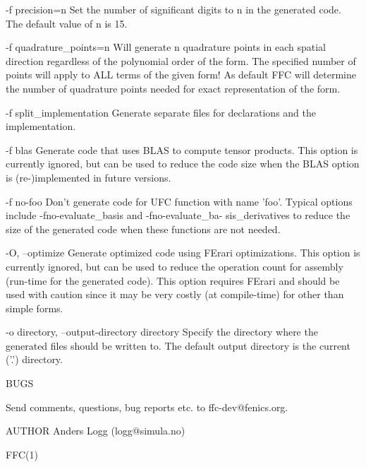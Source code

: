        -f precision=n
              Set the number of significant digits to n in the generated code.
              The default value of n is 15.

       -f quadrature_points=n
              Will generate n quadrature points in each spatial direction
              regardless of the polynomial order of the form. The specified
              number  of  points  will apply to ALL terms of the given form!
              As default FFC will determine the number of quadrature points
              needed for exact representation of the form.

       -f split_implementation
              Generate separate files for declarations and the implementation.

       -f blas
              Generate  code that uses BLAS to compute tensor products.  This
              option is currently ignored, but can be used to reduce the code
              size when the BLAS option is (re-)implemented in future versions.

       -f no-foo
              Don't generate code for UFC function with name 'foo'. Typical
              options   include   -fno-evaluate_basis   and  -fno-evaluate_ba-
              sis_derivatives to reduce the size  of  the generated code when
              these functions are not needed.

       -O, --optimize
              Generate optimized code using FErari optimizations. This  option
              is  currently  ignored,  but can be used to reduce the operation
              count for assembly  (run-time  for  the  generated  code).  This
              option  requires FErari and should be used with caution since it
              may be very costly  (at  compile-time)  for  other  than  simple
              forms.

       -o directory, --output-directory directory
              Specify the directory where the generated files should be written
              to. The default output directory is the current ('.') directory.

       BUGS

       Send comments, questions, bug reports etc. to ffc-dev@fenics.org.

AUTHOR
       Anders Logg (logg@simula.no)

                                                                        FFC(1)
